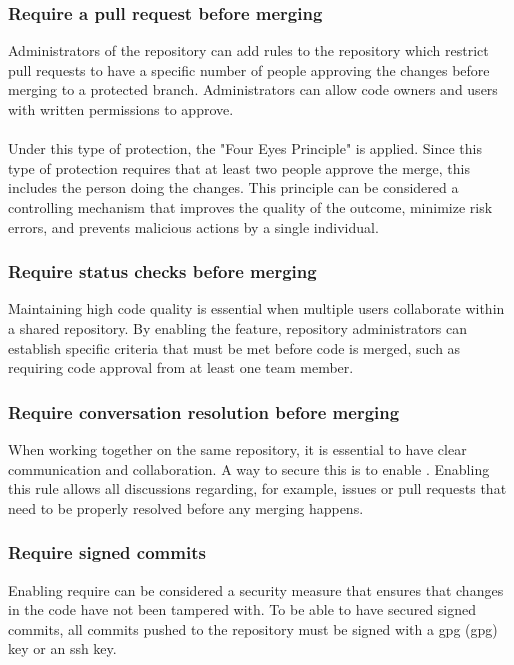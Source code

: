 \subsubsection{Require a pull request before merging}
Administrators of the repository can add rules to the repository which restrict pull requests to have a specific number of people approving the changes before merging to a protected branch. Administrators can allow code owners and users with written permissions to approve.
\\~\\
Under this type of protection, the "Four Eyes Principle" is applied. Since this type of protection requires that at least two people approve the merge, this includes the person doing the changes. This principle can be considered a controlling mechanism that improves the quality of the outcome, minimize risk errors, and prevents malicious actions by a single individual. 

\subsubsection{Require status checks before merging}
Maintaining high code quality is essential when multiple users collaborate within a shared repository. By enabling the  feature, repository administrators can establish specific criteria that must be met before code is merged, such as requiring code approval from at least one team member.

\subsubsection{Require conversation resolution before merging}
When working together on the same repository, it is essential to have clear communication and collaboration. A way to secure this is to enable . Enabling this rule allows all discussions regarding, for example, issues or pull requests that need to be properly resolved before any merging happens. 

\subsubsection{Require signed commits}
Enabling require  can be considered a security measure that ensures that changes in the code have not been tampered with. To be able to have secured signed commits, all commits pushed to the repository must be signed with a \acrlong{gpg} (\acrshort{gpg}) key or an \acrshort{ssh} key. 


